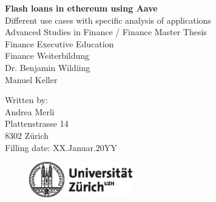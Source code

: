 \documentclass[11pt,a4paper,titlepage]{scrartcl}
\begin{document}
 


\newpage

\thispagestyle{plain}
\begin{titlepage}

\begin{center}

\huge{\textbf{Flash loans in ethereum using Aave}}\\[1.5ex]
\LARGE{Different use cases with specific analysis of applications}\\[6ex]
\Large{Advanced Studies in Finance /  Finance Master Thesis \\
Finance Executive Education  \\
Finance Weiterbildung}\\[1.5ex]
\Large{Dr. Benjamin Wildiing}\\
\Large{Manuel Keller}\\[12	ex]


\end{center}


\normalsize
\begin{flushleft}
Written by:\\[3ex]
Andrea Merli\\[1ex]
Plattenstrasse 14\\[1ex]
8302 Zürich\\[3ex]

Filling date: XX.Januar.20YY\\[10ex]
\end{flushleft}

\begin {figure}[h]
\begin {center}
\includegraphics [width=4.5cm] {uzh_logo_d_pos.eps}
\end {center}
\end {figure}


\end{titlepage}



\end{document}
